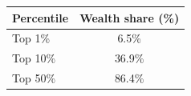 \begin{tabular}{lc}
\toprule
Percentile & Wealth share (\%) \\
\midrule
Top 1\%  & 6.5\% \\
Top 10\% & 36.9\% \\
Top 50\% & 86.4\% \\
\bottomrule
\end{tabular}
